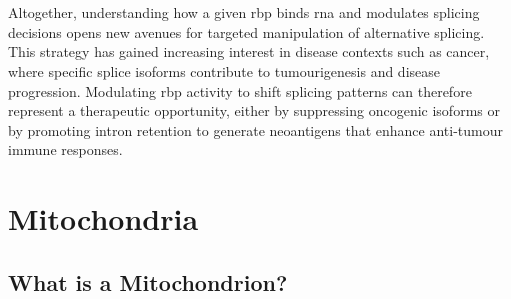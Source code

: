 \\
\\
Altogether, understanding how a given \gls{rbp} binds \gls{rna} and modulates splicing decisions opens new avenues for targeted manipulation of alternative splicing. This strategy has gained increasing interest in disease contexts such as cancer, where specific splice isoforms contribute to tumourigenesis and disease progression\cite{rogalska_regulation_2023}. Modulating \gls{rbp} activity to shift splicing patterns can therefore represent a therapeutic opportunity, either by suppressing oncogenic isoforms or by promoting intron retention to generate neoantigens that enhance anti-tumour immune responses\cite{rogalska_regulation_2023}.

\section{Mitochondria}

\subsection{What is a Mitochondrion?}

